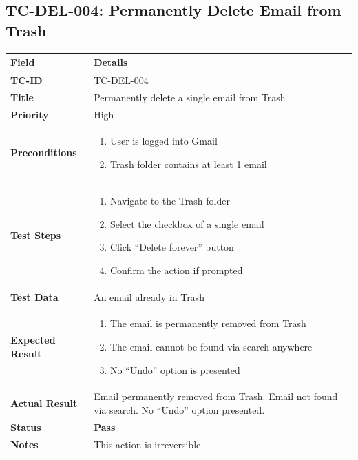 \documentclass[12pt,a4paper]{article}
\begin{document}
\subsection{TC-DEL-004: Permanently Delete Email from Trash}

\begin{longtable}{|L{3.5cm}|L{11.5cm}|}
\hline
{}\textbf{Field} & \textbf{Details} \\
\hline
\textbf{TC-ID}           & TC-DEL-004 \\
\hline
\textbf{Title}           & Permanently delete a single email from Trash \\
\hline
\textbf{Priority}        & High \\
\hline
\textbf{Preconditions}   & \begin{enumerate}[noitemsep,topsep=0pt]
                              \item User is logged into Gmail
                              \item Trash folder contains at least 1 email
                            \end{enumerate} \\
\hline
\textbf{Test Steps}      & \begin{enumerate}[noitemsep,topsep=0pt]
                              \item Navigate to the Trash folder
                              \item Select the checkbox of a single email
                              \item Click ``Delete forever'' button
                              \item Confirm the action if prompted
                            \end{enumerate} \\
\hline
\textbf{Test Data}       & An email already in Trash \\
\hline
\textbf{Expected Result} & \begin{enumerate}[noitemsep,topsep=0pt]
                              \item The email is permanently removed from Trash
                              \item The email cannot be found via search anywhere
                              \item No ``Undo'' option is presented
                            \end{enumerate} \\
\hline
\textbf{Actual Result}   & Email permanently removed from Trash. Email not found via search. No ``Undo'' option presented. \\
\hline
\textbf{Status}          & \textcolor{passgreen}{\textbf{Pass}} \\
\hline
\textbf{Notes}           & This action is irreversible \\
\hline
\end{longtable}
\end{document}
